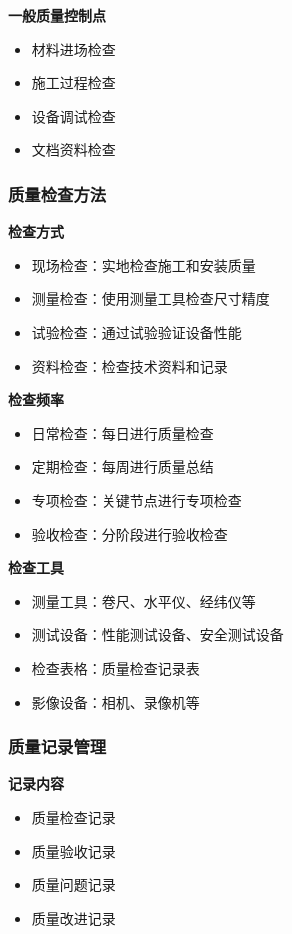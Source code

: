 \documentclass[UTF8,a4paper,12pt]{article}
\begin{document}
\textbf{一般质量控制点}
\begin{itemize}
    \item 材料进场检查
    \item 施工过程检查
    \item 设备调试检查
    \item 文档资料检查
\end{itemize}

\subsubsection{质量检查方法}
\textbf{检查方式}
\begin{itemize}
    \item 现场检查：实地检查施工和安装质量
    \item 测量检查：使用测量工具检查尺寸精度
    \item 试验检查：通过试验验证设备性能
    \item 资料检查：检查技术资料和记录
\end{itemize}

\textbf{检查频率}
\begin{itemize}
    \item 日常检查：每日进行质量检查
    \item 定期检查：每周进行质量总结
    \item 专项检查：关键节点进行专项检查
    \item 验收检查：分阶段进行验收检查
\end{itemize}

\textbf{检查工具}
\begin{itemize}
    \item 测量工具：卷尺、水平仪、经纬仪等
    \item 测试设备：性能测试设备、安全测试设备
    \item 检查表格：质量检查记录表
    \item 影像设备：相机、录像机等
\end{itemize}

\subsubsection{质量记录管理}
\textbf{记录内容}
\begin{itemize}
    \item 质量检查记录
    \item 质量验收记录
    \item 质量问题记录
    \item 质量改进记录
\end{itemize}
\end{document}
